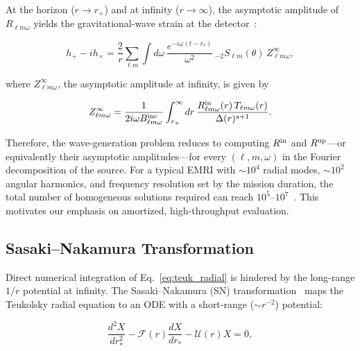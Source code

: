 \documentclass[aps,prd,twocolumn,superscriptaddress,nofootinbib]{revtex4-2}
\begin{document}
At the horizon ($r \to r_+$) and at infinity ($r \to \infty$), the
asymptotic amplitude of $R_{\ell m \omega}$ yields the gravitational-wave strain
at the detector~\cite{Sasaki:2003lr}:

\begin{equation}
  h_+ - i h_\times = \frac{2}{r}
    \sum_{\ell m} \int d\omega\, \frac{e^{-i\omega(t - r_*)}}{\omega^2}\,
    {}_{-2}S_{\ell m}(\theta)\, Z^{\infty}_{\ell m \omega},
  \label{eq:strain}
\end{equation}

where $Z^{\infty}_{\ell m \omega}$, the asymptotic amplitude at infinity, is
given by~\cite{Sasaki:2003lr}

\begin{equation}
  Z^{\infty}_{\ell m \omega} = \frac{1}{2 i \omega B^{\rm inc}_{\ell m \omega}}
    \int_{r_+}^{\infty} dr\,
    \frac{R^{\rm in}_{\ell m \omega}(r)\,
      T_{\ell m \omega}(r)}{\Delta(r)^{s+1}}.
  \label{eq:Z_infinity}
\end{equation}

Therefore, the wave-generation problem reduces to computing $R^{\rm in}$ and
$R^{\rm up}$---or equivalently their asymptotic amplitudes---for every
$(\ell, m, \omega)$ in the Fourier decomposition of the source.  For a typical
EMRI with $\sim 10^4$ radial modes, $\sim 10^2$ angular harmonics, and
frequency resolution set by the mission duration, the total number of
homogeneous solutions required can reach $10^{5}$--$10^{7}$~\cite{Jiang:2025jh}.
This motivates our emphasis on amortized, high-throughput evaluation.

\subsection{Sasaki--Nakamura Transformation}

Direct numerical integration of Eq.~\eqref{eq:teuk_radial} is hindered by the
long-range $1/r$ potential at infinity.  The Sasaki--Nakamura (SN)
transformation~\cite{Sasaki:1982sx} maps the Teukolsky radial equation to an
ODE with a short-range ($\sim r^{-2}$) potential:

\begin{equation}
  \frac{d^2 X}{dr_*^2} - \mathcal{F}(r) \frac{dX}{dr_*}
    - \mathcal{U}(r) X = 0,
  \label{eq:SN}
\end{equation}
\end{document}
